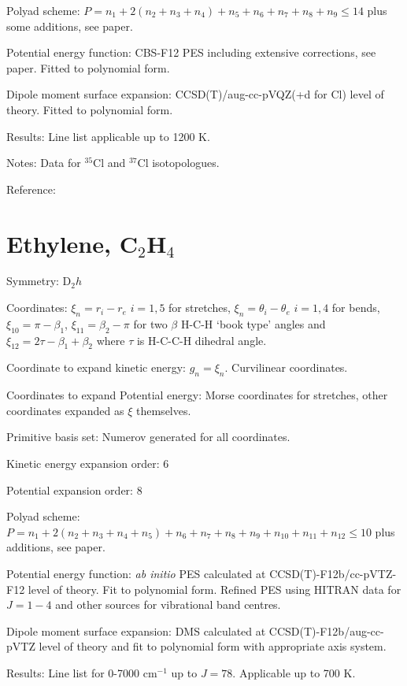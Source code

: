 Polyad scheme: $P = n_1 + 2(n_2 + n_3 + n_4) + n_5 + n_6 + n_7 + n_8 + n_9 \leq 14$ plus some additions, see paper.

Potential energy function: CBS-F12 PES including extensive corrections, see paper. Fitted to polynomial form.

Dipole moment surface expansion: CCSD(T)/aug-cc-pVQZ(+d for Cl) level of theory. Fitted to polynomial form.

Results: Line list applicable up to 1200 K.

Notes: Data for $^{35}$Cl and $^{37}$Cl isotopologues. 

Reference: \cite{jt612,jt649,jt733}


\section{Ethylene, C$_2$H$_4$}

Symmetry: D$_2h$

Coordinates: $\xi_n = r_i-r_e$ $i=1,5$ for stretches, $\xi_n = \theta_i - \theta_e$  $i = 1, 4$ for bends, 
$\xi_10 = \pi - \beta_1$, $\xi_11 = \beta_2 - \pi$ for two $\beta$ H-C-H `book type' angles and 
$\xi_12 = 2 \tau - \beta_1 + \beta_2$ where $\tau$ is H-C-C-H dihedral angle.

Coordinate to expand kinetic energy: $g_n = \xi_n$. Curvilinear coordinates.

Coordinates to expand Potential energy: Morse coordinates for stretches, other coordinates expanded as $\xi$ themselves.

Primitive basis set: Numerov generated for all coordinates.

Kinetic energy expansion order: 6

Potential expansion order: 8

Polyad scheme: $P = n_1 + 2(n_2 + n_3 + n_4 + n_5) + n_6 + n_7 + n_8 + n_9 + n_{10} + n_{11} + n_{12} \leq 10$ plus additions, 
see paper.

Potential energy function: \textit{ab initio} PES calculated at  CCSD(T)-F12b/cc-pVTZ-F12 level of theory. Fit to polynomial 
form. Refined PES using HITRAN data for $J=1-4$ and other sources for vibrational band centres.

Dipole moment surface expansion: DMS calculated at CCSD(T)-F12b/aug-cc-pVTZ level of theory and fit to polynomial form with
appropriate axis system.

Results: Line list for 0-7000 cm$^{-1}$ up to $J=78$. Applicable up to 700 K. 

